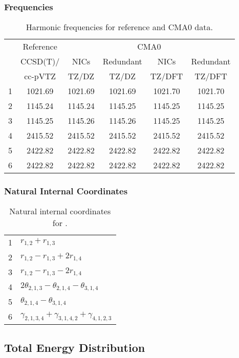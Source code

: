\documentclass[10pt,oneside]{article}
\begin{document}
\begin{table}[h!]
\subsubsection*{Frequencies}
\centering
\caption{Harmonic frequencies for reference and CMA0 data.}
\begin{tabular}{cccccc}
\toprule
{} & Reference & \multicolumn{4}{c}{CMA0} \\
{} &  CCSD(T)/ &    NICs &  Redundant &    NICs & Redundant \\
{} &   cc-pVTZ &   TZ/DZ &      TZ/DZ &  TZ/DFT &    TZ/DFT \\
\midrule
1 &   1021.69 & 1021.69 &    1021.69 & 1021.70 &   1021.70 \\
2 &   1145.24 & 1145.24 &    1145.25 & 1145.25 &   1145.25 \\
3 &   1145.25 & 1145.26 &    1145.26 & 1145.25 &   1145.25 \\
4 &   2415.52 & 2415.52 &    2415.52 & 2415.52 &   2415.52 \\
5 &   2422.82 & 2422.82 &    2422.82 & 2422.82 &   2422.82 \\
6 &   2422.82 & 2422.82 &    2422.82 & 2422.82 &   2422.82 \\
\bottomrule
\end{tabular}
\end{table}

\begin{table}[h!]
\subsubsection*{Natural Internal Coordinates}
\centering
\caption{Natural internal coordinates for .}
\small
\begin{tabular}{ll}
\toprule
  1   & $r_{1,2} + r_{1,3}$ \\
  2   & $r_{1,2} - r_{1,3} + 2r_{1,4}$ \\
  3   & $r_{1,2} - r_{1,3} - 2r_{1,4}$ \\
  4   & $2\theta_{2,1,3} - \theta_{2,1,4} - \theta_{3,1,4}$ \\
  5   & $\theta_{2,1,4} - \theta_{3,1,4}$ \\
  6   & $\gamma_{2,1,3,4} + \gamma_{3,1,4,2} + \gamma_{4,1,2,3}$ \\
\bottomrule
\end{tabular}
\end{table}

\begin{table}
\subsection*{Total Energy Distribution}
\centering\end{table}
\end{document}
